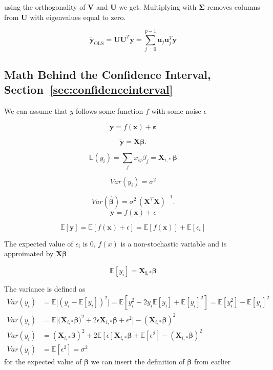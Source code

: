 \documentclass[twoside,11pt]{report}
\begin{document}
using the orthogonality of $\mathbf{V}$ and $\mathbf{U}$ we get. Multiplying with $\mathbf{\Sigma}$ removes columns from $\mathbf{U}$ with eigenvalues equal to zero.

$$
\tilde{\mathbf{y}}_{\mathrm{OLS}} = \mathbf{U}\mathbf{U}^T \mathbf{y}= \sum_{j=0}^{p-1}\mathbf{u}_j\mathbf{u}_j^T\mathbf{y}
$$




%
\subsection*{Math Behind the Confidence Interval, Section~\ref{sec:confidenceinterval}}
\label{app:confidenceinterval}
We can assume that $y$ follows some function $f$ with some noise $\epsilon$

$$
\mathbf{y} = f(\mathbf{x})+\mathbf{\varepsilon}
$$

$$
\mathbf{\tilde{y}} = \mathbf{X}\mathbf{\beta}.
$$

$$
\mathbb{E}(y_i)  =\sum_{j}x_{ij} \beta_j=\mathbf{X}_{i, \ast} \, \mathbf{\beta}
$$

$$
{Var}(y_i)  = \sigma^2
$$

$$
{Var}(\mathbf{\hat{\beta}}) = \sigma^2 \, (\mathbf{X}^{T} \mathbf{X})^{-1}.
$$
$$
\mathbf{y} = f(\mathbf{x}) + \epsilon
$$

$$
\mathbb{E}[\mathbf{y}] = \mathbb{E}[f(\mathbf{x} )+ \epsilon] = \mathbb{E}[f(\mathbf{x})] + \mathbb{E}[\epsilon_i]
$$

The expected value of $\epsilon_i$ is $0$, $f(x)$ is a non-stochastic variable and is approimated by $\mathbf{X}\mathbf{\beta}$

$$
\mathbb{E}[y_i] = \mathbf{X_{i,*}}\mathbf{\beta}
$$

The variance is defined as
\begin{align*}
Var(y_i) &= \mathbb{E}\big[(y_i - \mathbb{E}[y_i])^2\big] = \mathbb{E}\left[y_i^2 - 2y_i\mathbb{E}[y_i] + \mathbb{E}[y_i]^2\right] = \mathbb{E}[y_i^2] - \mathbb{E}[y_i]^2\\
Var(y_i) &= \mathbb{E}\big[\big(\mathbf{X}_{i,*}\mathbf{\beta}\big)^2 + 2\epsilon \mathbf{X}_{i,*}\mathbf{\beta} + \epsilon^2 \big] - (\mathbf{X}_{i,*}\mathbf{\beta})^2\\
Var(y_i) &= (\mathbf{X}_{i,*}\mathbf{\beta})^2 + 2\mathbb{E}[\epsilon]\mathbf{X}_{i,*}\mathbf{\beta} + \mathbb{E}[\epsilon^2] - (\mathbf{X}_{i,*}\mathbf{\beta})^2\\
Var(y_i) &= \mathbb{E}[\epsilon^2] = \sigma^2
\end{align*}
for the expected value of $\mathbf{\beta}$ we can insert the definition of $\mathbf{\beta}$ from earlier
\end{document}
